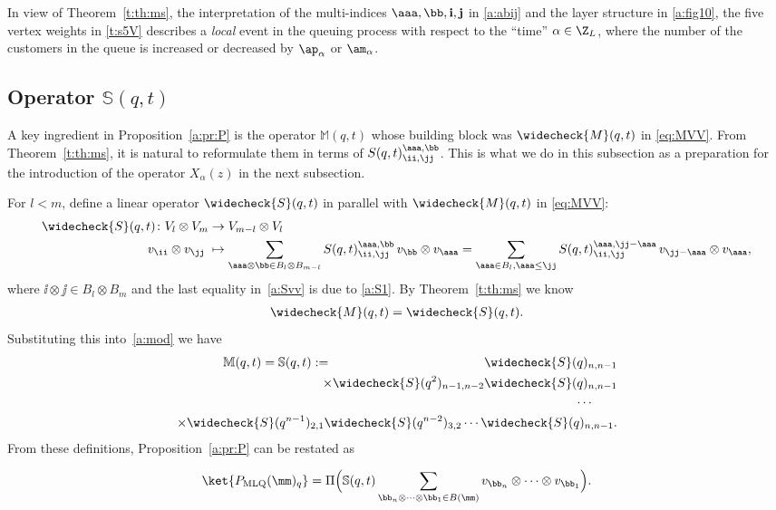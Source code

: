 In view of Theorem~\ref{t:th:ms}, the interpretation of the multi-indices $\aaa, \bb, {\bf i}, {\bf j}$ in \eqref{a:abij} 
and the layer structure in \eqref{a:fig10},  the five vertex weights in \eqref{t:s5V} describes 
 a \emph{local} event in the queuing process with respect to the ``time'' $\alpha \in \Z_L$,
 where the number of the customers in the queue is increased or decreased by $\ap_\alpha$ or $\am_\alpha$. 

\subsection{Operator \texorpdfstring{$\mathbb{S}(q,t)$}{S(q,t)}}\label{subsec:S}
A key ingredient in Proposition~\ref{a:pr:P} is the operator $\mathbb{M}(q,t)$ whose 
building block was $\widecheck{M}(q,t)$ in \eqref{eq:MVV}.
From Theorem~\ref{t:th:ms}, it is natural to reformulate them in terms of 
$S(q,t)^{\aaa, \bb}_{\ii, \jj} $.
This is what we do in this subsection as a preparation for the introduction of the operator $X_\alpha(z)$ 
in the next subsection.

For $l < m$, define a linear operator $\widecheck{S}(q,t)$ in parallel with $\widecheck{M}(q,t)$ in \eqref{eq:MVV}:
\begin{subequations}
\label{eq:SVV}
\begin{align}
\widecheck{S}(q,t)\colon V_l \otimes V_m & \rightarrow V_{m-l} \otimes V_l
\label{a:Svv0} \\
v_\ii \otimes v_\jj \;&\mapsto
\sum_{\aaa \otimes \bb \in B_l\otimes B_{m-l}}
S(q,t)^{\aaa, \bb}_{\ii, \jj} \,v_{\bb} \otimes v_\aaa = \sum_{\aaa \in B_l, \aaa\le \jj} S(q,t)^{\aaa, \jj-\aaa}_{\ii, \jj} \,v_{\jj-\aaa} \otimes v_\aaa,
\label{a:Svv}
\end{align}
\end{subequations}
where $\ii \otimes \jj \in B_l \otimes B_m$ and the last equality in~\eqref{a:Svv} is due to \eqref{a:S1}.
By Theorem~\ref{t:th:ms} we know
\begin{align}
\widecheck{M}(q,t) = \widecheck{S}(q,t).
\end{align}
%
Substituting this into~\eqref{a:mod} we have
 \begin{equation}\label{a:mod2}
 \begin{split}
 \mathbb{M}(q,t) = \mathbb{S}(q,t):=\qquad \qquad \qquad \qquad \qquad \qquad 
  \widecheck{S}(q)_{n,n-1}& \\
 \times  \widecheck{S}(q^2)_{n-1,n-2} \widecheck{S}(q)_{n,n-1} & \\
 \cdots \qquad \\
 \times \widecheck{S}(q^{n-1})_{2,1}  \widecheck{S}(q^{n-2})_{3,2} 
 \cdots \widecheck{S}(q)_{n,n-1}.
 \end{split}
 \end{equation} 
%
From these definitions,  Proposition~\ref{a:pr:P} can be restated as 
\begin{coro}\label{t:co:P}
\begin{align}\label{a:pm}
 \ket{P_{\text{MLQ}}(\mm)_q} = 
 \Pi\Bigl(
 \mathbb{S}(q,t)\sum_{\bb_n \otimes \cdots \otimes \bb_1 \in B(\mm)}
 v_{\bb_n} \otimes \cdots \otimes v_{\bb_1} 
 \Bigr).
\end{align}
\end{coro}

